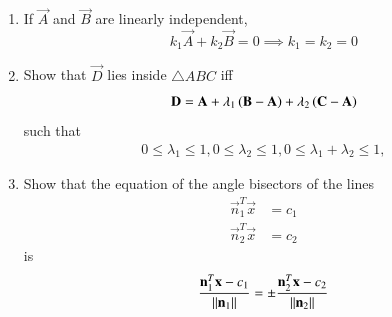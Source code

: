 \begin{enumerate}[label=\arabic*.,ref=\thesubsection.\theenumi]
%
\item If $\vec{A}$ and $\vec{B}$ are linearly independent,  
\begin{equation}
k_1\vec{A} + k_2\vec{B} = 0 \implies k_1=k_2=0
\end{equation}
\item Show that $\vec{D}$ lies inside $\triangle ABC$ iff
\begin{align}
\mathbf{D} = \mathbf{A} + \lambda_1\left(\mathbf{B}-\mathbf{A}\right) + \lambda_2\left(\mathbf{C}-\mathbf{A}\right)
\end{align}
such that
\begin{align}
0 \le \lambda_1 \le 1,
0 \le \lambda_2 \le 1,
0 \le \lambda_1+\lambda_2 \le 1,
\end{align}
\item Show that the equation of the angle bisectors of the lines
\begin{align}
\vec{n}_1^T\vec{x} &=c_1
\\
\vec{n}_2^T\vec{x} &=c_2
\end{align}
%
is
\begin{align}
\frac{\mathbf{n}_1^T\mathbf{x}-c_1}{\lVert\mathbf{n}_1\rVert}=\pm\frac{\mathbf{n}_2^T\mathbf{x} -c_2}{\lVert\mathbf{n}_2\rVert}\end{align}

\end{enumerate}
%
%
